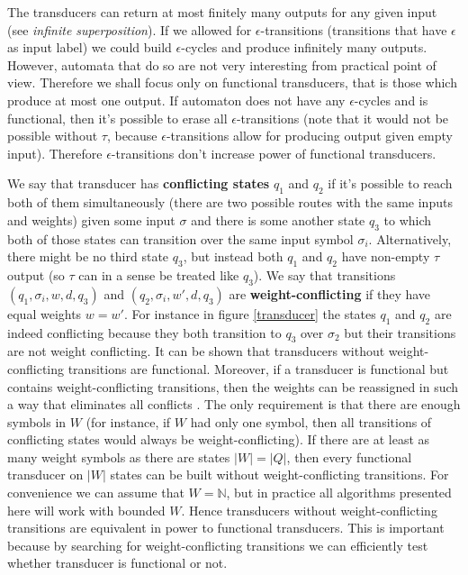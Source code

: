 \documentclass[journal]{journal}
\begin{document}
The transducers can return at most finitely many outputs for any given input (see \textit{infinite superposition}\cite{MendozaDrosik2020MultitapeAA}). If we allowed for $\epsilon$-transitions (transitions that have $\epsilon$ as input label) we could build $\epsilon$-cycles and produce infinitely many outputs. However, automata that do so are not very interesting from practical point of view. Therefore we shall focus only on functional transducers, that is those which produce at most one output. If automaton does not have any $\epsilon$-cycles and is functional, then it's possible to erase all $\epsilon$-transitions (note that it would not be possible without $\tau$, because $\epsilon$-transitions allow for producing output given empty input). Therefore $\epsilon$-transitions don't increase power of functional transducers.

We say that transducer has \textbf{conflicting states} $q_1$ and $q_2$ if it's possible to reach both of them simultaneously (there are two possible routes with the same inputs and weights) given some input $\sigma$ and there is some another state $q_3$ to which both of those states can transition over the same input symbol $\sigma_i$. Alternatively, there might be no third state $q_3$, but instead both $q_1$ and $q_2$ have non-empty $\tau$ output (so $\tau$ can in a sense be treated like $q_3$). We say that transitions $(q_1,\sigma_i,w,d,q_3)$ and $(q_2,\sigma_i,w',d,q_3)$  are \textbf{weight-conflicting} if they have equal weights $w=w'$.  For instance in figure \ref{transducer} the states $q_1$ and $q_2$ are indeed conflicting because they both transition to $q_3$ over $\sigma_2$ but their transitions are not weight conflicting. It can be shown that transducers without weight-conflicting  transitions are functional. Moreover, if a transducer is functional but contains weight-conflicting transitions, then the weights can be reassigned in such a way that eliminates all conflicts \cite{MendozaDrosik2020MultitapeAA}. The only requirement is that there are enough symbols in $W$ (for instance, if $W$ had only one symbol, then all transitions of conflicting states would always be weight-conflicting). If there are at least as many weight symbols as there are states $\vert W \vert = \vert Q \vert$, then every functional transducer on $\vert W \vert$ states can be built without weight-conflicting transitions. For convenience we can assume that $W=\mathbb{N}$, but in practice all algorithms presented here will work with bounded $W$. Hence transducers without weight-conflicting transitions are equivalent in power to functional transducers. This is important because by searching for weight-conflicting transitions we can efficiently test whether transducer is functional or not.
\end{document}
